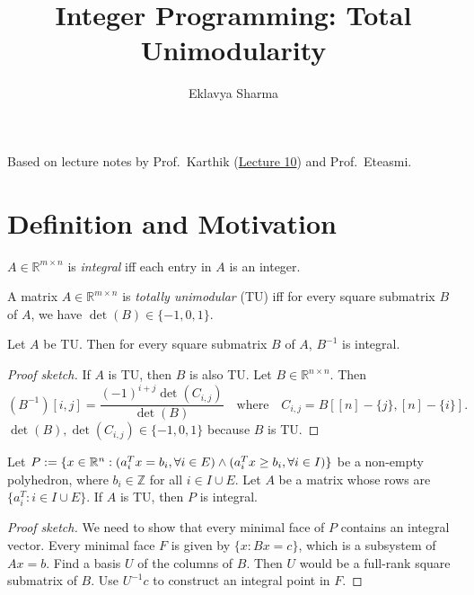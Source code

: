 \documentclass[a4paper,12pt,fleqn]{article}
\author{Eklavya Sharma}
\date{\empty}
\title{Integer Programming: Total Unimodularity}
\newcommand*{\karthikLec}[1]{http://karthik.ise.illinois.edu/courses/ie511/lectures-sp-21/lecture-#1.pdf}
\begin{document}
\maketitle
\setlength{\parskip}{0.2em}

Based on lecture notes by Prof.~Karthik (\href{\karthikLec{10}}{Lecture 10}) and Prof.~Eteasmi.

\section{Definition and Motivation}

\begin{definition}
$A \in \mathbb{R}^{m \times n}$ is \emph{integral} iff
each entry in $A$ is an integer.
\end{definition}

\begin{definition}
A matrix $A \in \mathbb{R}^{m \times n}$ is \emph{totally unimodular} (TU) iff
for every square submatrix $B$ of $A$, we have $\det(B) \in \{-1, 0, 1\}$.
\end{definition}

\begin{lemma}
Let $A$ be TU. Then for every square submatrix $B$ of $A$, $B^{-1}$ is integral.
\end{lemma}
\begin{proof}[Proof sketch]
If $A$ is TU, then $B$ is also TU. Let $B \in \mathbb{R}^{n \times n}$. Then
\[ (B^{-1})[i, j] = \frac{(-1)^{i+j}\det(C_{i,j})}{\det(B)}
\quad\textrm{where}\quad C_{i,j} = B[[n]-\{j\}, [n]-\{i\}]. \]
$\det(B), \det(C_{i,j}) \in \{-1, 0, 1\}$ because $B$ is TU.
\end{proof}

\begin{theorem}[TU polyhedron]
Let $P := \{x \in \mathbb{R}^n: (a_i^Tx = b_i, \forall i \in E) \wedge (a_i^Tx \ge b_i, \forall i \in I)\}$
be a non-empty polyhedron, where $b_i \in \mathbb{Z}$ for all $i \in I \cup E$.
Let $A$ be a matrix whose rows are $\{a_i^T: i \in I \cup E\}$.
If $A$ is TU, then $P$ is integral.
\end{theorem}
\begin{proof}[Proof sketch]
We need to show that every minimal face of $P$ contains an integral vector.
Every minimal face $F$ is given by $\{x: Bx = c\}$, which is a subsystem of $Ax = b$.
Find a basis $U$ of the columns of $B$. Then $U$ would be a full-rank square submatrix of $B$.
Use $U^{-1}c$ to construct an integral point in $F$.
\end{proof}
\end{document}
